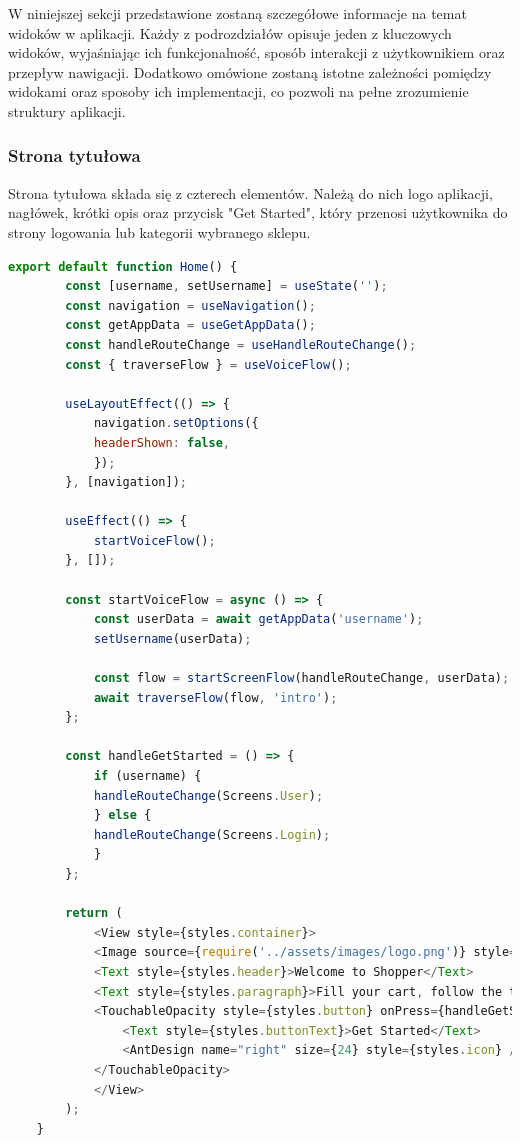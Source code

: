 W niniejszej sekcji przedstawione zostaną szczegółowe informacje na temat widoków w aplikacji. Każdy z podrozdziałów opisuje jeden z kluczowych widoków, wyjaśniając ich funkcjonalność, sposób interakcji z użytkownikiem oraz przepływ nawigacji. Dodatkowo omówione zostaną istotne zależności pomiędzy widokami oraz sposoby ich implementacji, co pozwoli na pełne zrozumienie struktury aplikacji.

\subsubsection{Strona tytułowa}

Strona tytułowa składa się z czterech elementów. Należą do nich logo aplikacji, nagłówek, krótki opis oraz przycisk "Get Started", który przenosi użytkownika do strony logowania lub kategorii wybranego sklepu.

\begin{lstlisting}[language=JavaScript, caption=Strona tytułowa implementacja, label=lst:service]
    export default function Home() {
        const [username, setUsername] = useState('');
        const navigation = useNavigation();
        const getAppData = useGetAppData();
        const handleRouteChange = useHandleRouteChange();
        const { traverseFlow } = useVoiceFlow();

        useLayoutEffect(() => {
            navigation.setOptions({
            headerShown: false,
            });
        }, [navigation]);

        useEffect(() => {
            startVoiceFlow();
        }, []);

        const startVoiceFlow = async () => {
            const userData = await getAppData('username');
            setUsername(userData);

            const flow = startScreenFlow(handleRouteChange, userData);
            await traverseFlow(flow, 'intro');
        };

        const handleGetStarted = () => {
            if (username) {
            handleRouteChange(Screens.User);
            } else {
            handleRouteChange(Screens.Login);
            }
        };

        return (
            <View style={styles.container}>
            <Image source={require('../assets/images/logo.png')} style={styles.logo} />
            <Text style={styles.header}>Welcome to Shopper</Text>
            <Text style={styles.paragraph}>Fill your cart, follow the trail, and make your shopping faster!</Text>
            <TouchableOpacity style={styles.button} onPress={handleGetStarted}>
                <Text style={styles.buttonText}>Get Started</Text>
                <AntDesign name="right" size={24} style={styles.icon} />
            </TouchableOpacity>
            </View>
        );
    }
\end{lstlisting}

